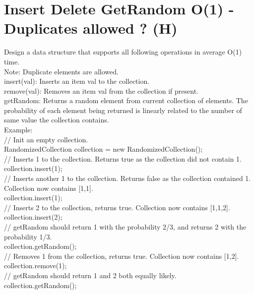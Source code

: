 \section{Insert Delete GetRandom O(1) - Duplicates allowed ? (H)}
Design a data structure that supports all following operations in average O(1) time.\\
Note: Duplicate elements are allowed.\\
    insert(val): Inserts an item val to the collection.\\
    remove(val): Removes an item val from the collection if present.\\
    getRandom: Returns a random element from current collection of elements. The probability of each element being returned is linearly related to the number of same value the collection contains.\\

Example:\\
// Init an empty collection.\\
RandomizedCollection collection = new RandomizedCollection();\\

// Inserts 1 to the collection. Returns true as the collection did not contain 1.\\
collection.insert(1);\\

// Inserts another 1 to the collection. Returns false as the collection contained 1. Collection now contains [1,1].\\
collection.insert(1);\\

// Inserts 2 to the collection, returns true. Collection now contains [1,1,2].\\
collection.insert(2);\\

// getRandom should return 1 with the probability 2/3, and returns 2 with the probability 1/3.\\
collection.getRandom();\\

// Removes 1 from the collection, returns true. Collection now contains [1,2].\\
collection.remove(1);\\

// getRandom should return 1 and 2 both equally likely.\\
collection.getRandom();\\

